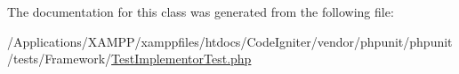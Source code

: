 The documentation for this class was generated from the following file\+:\begin{DoxyCompactItemize}
\item 
/\+Applications/\+X\+A\+M\+P\+P/xamppfiles/htdocs/\+Code\+Igniter/vendor/phpunit/phpunit/tests/\+Framework/\mbox{\hyperlink{_test_implementor_test_8php}{Test\+Implementor\+Test.\+php}}\end{DoxyCompactItemize}
